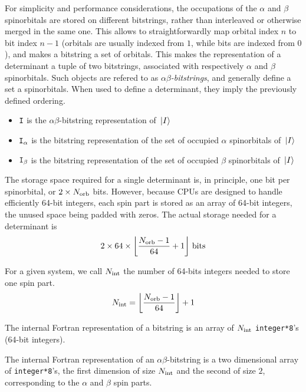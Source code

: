\documentclass[./thesis.tex]{subfiles}
\begin{document}
For simplicity and performance considerations, the occupations of the $\alpha$ and $\beta$ spinorbitals are stored on different bitstrings, rather than interleaved or otherwise merged in the same one. This allows to straightforwardly map orbital index $n$ to bit index $n-1$ (orbitals are usually indexed from $1$, while bits are indexed from $0$), and makes a bitstring a set of orbitals.
This makes the representation of a determinant a tuple of two bitstrings, associated with respectively $\alpha$ and $\beta$ spinorbitals. Such objects are refered to as \emph{$\alpha \beta$-bitstrings}, and generally define a set a spinorbitals. When used to define a determinant, they imply the previously defined ordering.


\begin{itemize}
\item
${\texttt{I}}$ is the $\alpha \beta$-bitstring representation of ${\ket*{I}}$
\item
${\texttt{I}}_\alpha$ is the bitstring representation of the set of occupied $\alpha$ spinorbitals of ${\ket*{I}}$ 
\item
${\texttt{I}}_\beta$ is the bitstring representation of the set of occupied $\beta$ spinorbitals of ${\ket*{I}}$ 

\end{itemize}


The storage space required for a single determinant is, in principle, one bit per spinorbital, or $2 \times {N_\text{orb}}$ bits. However, because CPUs are designed to handle efficiently 64-bit integers, each spin part is stored as an array of 64-bit integers, the unused space being padded with zeros. 
The actual storage needed for a determinant is
$$
2 \times 64 \times  \left \lfloor \frac{{N_\text{orb}}-1}{64} + 1 \right \rfloor \, \text{bits}
\label{determinantstoragespace}
$$

For a given system, we call ${N_\text{int}}$ the number of 64-bits integers needed to store one spin part.
\begin{equation}
{N_\text{int}} = \left \lfloor \frac{{N_\text{orb}}-1}{64} \right \rfloor + 1
\end{equation}


The internal Fortran representation of a bitstring is an array of ${N_\text{int}}$ \lstinline{integer*8}'s (64-bit integers).

The internal Fortran representation of an $\alpha \beta$-bitstring is a two dimensional array of \lstinline{integer*8}'s, the first dimension of size ${N_\text{int}}$ and the second of size $2$, corresponding to the $\alpha$ and $\beta$ spin parts.
\end{document}
